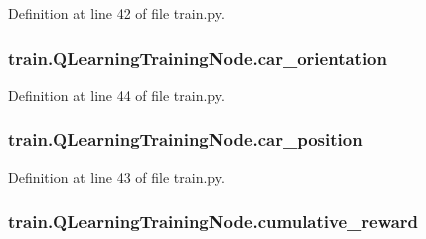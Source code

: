Definition at line 42 of file train.\+py.

\subsubsection[{\texorpdfstring{car\+\_\+orientation}{car_orientation}}]{\setlength{\rightskip}{0pt plus 5cm}train.\+Q\+Learning\+Training\+Node.\+car\+\_\+orientation}\hypertarget{classtrain_1_1_q_learning_training_node_a016d2adc85428e64903703974f8cd79c}{}\label{classtrain_1_1_q_learning_training_node_a016d2adc85428e64903703974f8cd79c}


Definition at line 44 of file train.\+py.

\subsubsection[{\texorpdfstring{car\+\_\+position}{car_position}}]{\setlength{\rightskip}{0pt plus 5cm}train.\+Q\+Learning\+Training\+Node.\+car\+\_\+position}\hypertarget{classtrain_1_1_q_learning_training_node_ac802eca257307ce6c83897c612aa5f90}{}\label{classtrain_1_1_q_learning_training_node_ac802eca257307ce6c83897c612aa5f90}


Definition at line 43 of file train.\+py.

\subsubsection[{\texorpdfstring{cumulative\+\_\+reward}{cumulative_reward}}]{\setlength{\rightskip}{0pt plus 5cm}train.\+Q\+Learning\+Training\+Node.\+cumulative\+\_\+reward}\hypertarget{classtrain_1_1_q_learning_training_node_a4c632e44085797e564501bba836b7359}{}\label{classtrain_1_1_q_learning_training_node_a4c632e44085797e564501bba836b7359}


